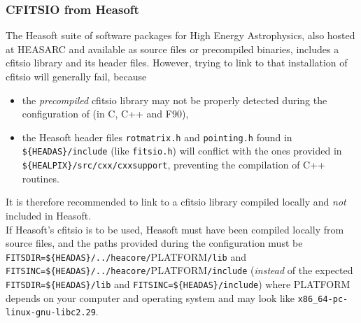 \documentclass[12pt,twoside]{article}
\begin{document}
\subsubsection*{CFITSIO from Heasoft}
\label{install:heasoft}
%
The Heasoft suite of software packages for High Energy Astrophysics, 
also hosted at HEASARC and available as source files or precompiled binaries, 
includes a cfitsio library and its header files.
However, trying to link \healpix to that installation of cfitsio will generally fail, because
\begin{itemize}
\item the {\em precompiled} cfitsio library may not be properly detected during the configuration of 
\healpix (in C, C++ and F90),
\item the Heasoft header files 
\texttt{rotmatrix.h} and 
\texttt{pointing.h} found in 
\texttt{\$\{HEADAS\}/include} (like
\texttt{fitsio.h}) will conflict with the ones provided in 
\texttt{\$\{HEALPIX\}/src/cxx/cxxsupport},
preventing the compilation of \healpix C++ routines.
\end{itemize}
It is therefore recommended to link \healpix to a cfitsio library compiled 
locally and {\em not} included in Heasoft.\\
If Heasoft's cfitsio is to be used, 
Heasoft must have been compiled locally from source files,
and the paths provided during the \healpix configuration must be
\texttt{FITSDIR=\$\{HEADAS\}/../heacore/}PLATFORM\texttt{/lib} and
\texttt{FITSINC=\$\{HEADAS\}/../heacore/}PLATFORM\texttt{/include}
(\emph{instead} of the expected 
\texttt{FITSDIR=\$\{HEADAS\}/lib} and
\texttt{FITSINC=\$\{HEADAS\}/include})
where PLATFORM depends on your computer and operating system and may look like \texttt{x86\_64-pc-linux-gnu-libc2.29}.




\end{document}
